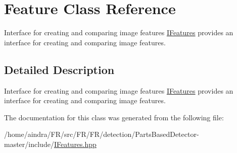 \hypertarget{classFeature}{\section{\-Feature \-Class \-Reference}
\label{classFeature}
}


\-Interface for creating and comparing image features \hyperlink{classIFeatures}{\-I\-Features} provides an interface for creating and comparing image features.  




\subsection{\-Detailed \-Description}
\-Interface for creating and comparing image features \hyperlink{classIFeatures}{\-I\-Features} provides an interface for creating and comparing image features. 

\-The documentation for this class was generated from the following file\-:\begin{DoxyCompactItemize}
\item 
/home/aindra/\-F\-R/src/\-F\-R/\-F\-R/detection/\-Parts\-Based\-Detector-\/master/include/\hyperlink{IFeatures_8hpp}{\-I\-Features.\-hpp}\end{DoxyCompactItemize}
